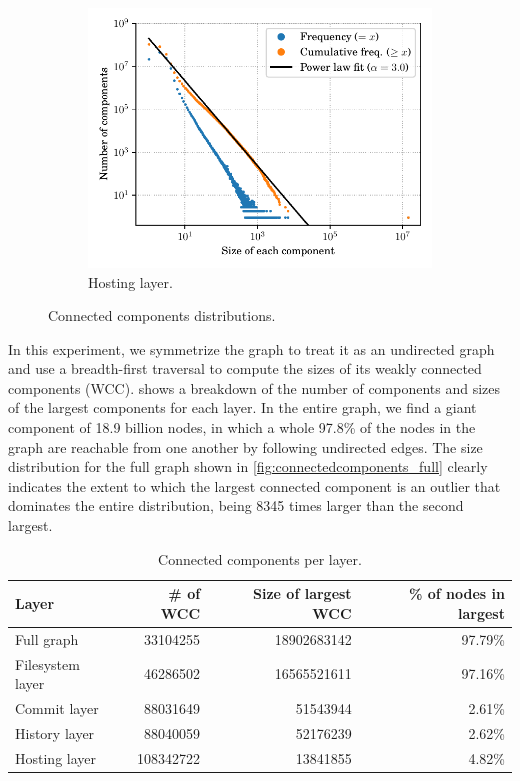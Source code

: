 \begin{figure}
\begin{subfigure}{.49\textwidth}
        \includegraphics[width=\linewidth]{img/topology/connectedcomponents/ori+snp}
        \caption{Hosting layer.}
        \label{fig:connectedcomponents_ori+snp}
    \end{subfigure}

    \caption{Connected components distributions.}
    \label{fig:connectedcomponents}
\end{figure}

In this experiment, we symmetrize the graph to treat it as an undirected graph
and use a breadth-first traversal to compute the sizes of its weakly connected
components (WCC).  shows a breakdown of the number of
components and sizes of the largest components for each layer. In the entire
graph, we find a giant component of 18.9 billion nodes, in which a whole 97.8\%
of the nodes in the graph are reachable from one another by following
undirected edges. The size distribution for the full graph shown in
\cref{fig:connectedcomponents_full} clearly indicates the extent to which the
largest connected component is an outlier that dominates the entire
distribution, being 8345 times larger than the second largest.

\begin{table}
  \centering
  \caption{Connected components per layer.}
  \label{tab:wcc-stats}
  \begin{tabular}[t]{l r r r}
      \textbf{Layer} & \textbf{\# of WCC}
                     & \textbf{Size of largest WCC}
                     & \textbf{\% of nodes in largest}
                     \\
    \hline
      Full graph       & \num{33104255}  & \num{18902683142} & 97.79\% \\
      Filesystem layer & \num{46286502}  & \num{16565521611} & 97.16\% \\
      Commit layer     & \num{88031649}  & \num{51543944}    & 2.61\% \\
      History layer    & \num{88040059}  & \num{52176239}    & 2.62\% \\
      Hosting layer    & \num{108342722} & \num{13841855}    & 4.82\%
  \end{tabular}
\end{table}


